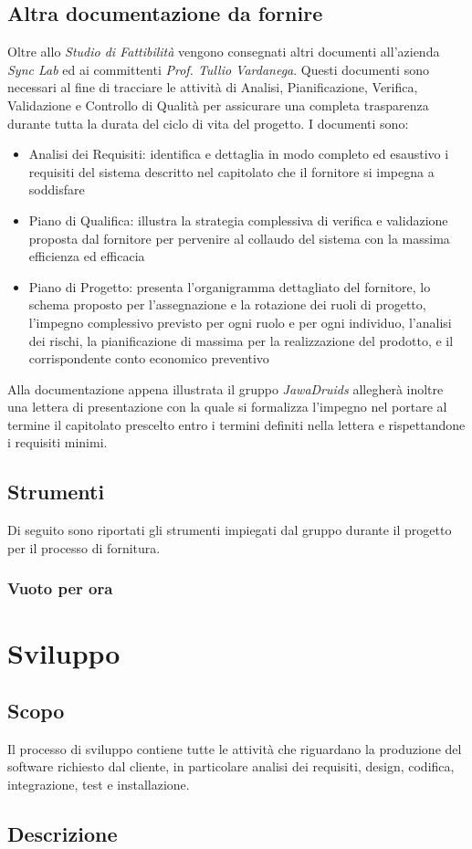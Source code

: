 \subsection{Altra documentazione da fornire}
Oltre allo \emph{Studio di Fattibilità} vengono consegnati altri documenti all'azienda \emph{Sync Lab} ed ai committenti \emph{Prof. Tullio Vardanega}. Questi documenti sono necessari al fine di tracciare le attività di Analisi, Pianificazione, Verifica, Validazione e Controllo di Qualità per assicurare una completa trasparenza durante tutta la durata del ciclo di vita del progetto.
I documenti sono:
\begin{itemize}
	\item Analisi dei Requisiti: identifica e dettaglia in modo completo ed esaustivo i requisiti del sistema descritto nel capitolato che il fornitore si impegna a soddisfare
	\item Piano di Qualifica: illustra la strategia complessiva di verifica e validazione proposta dal fornitore per pervenire al collaudo del sistema con la massima efficienza ed efficacia
	\item Piano di Progetto: presenta l'organigramma dettagliato del fornitore, lo schema proposto per l'assegnazione e la rotazione dei ruoli di progetto, l'impegno complessivo previsto per ogni ruolo e per ogni individuo, l'analisi dei rischi, la pianificazione di massima per la realizzazione del prodotto, e il corrispondente conto economico preventivo
\end{itemize} 
Alla documentazione appena illustrata il gruppo \emph{JawaDruids} allegherà inoltre una lettera di presentazione con la quale si formalizza l'impegno nel portare al termine il capitolato prescelto entro i termini definiti nella lettera e rispettandone i requisiti minimi.
\subsection{Strumenti}
Di seguito sono riportati gli strumenti impiegati dal gruppo durante il progetto per il processo di fornitura.
\subsubsection{Vuoto per ora}


\section{Sviluppo}
\subsection{Scopo}
Il processo di sviluppo contiene tutte le attività che riguardano la produzione del software richiesto dal cliente, in particolare analisi dei requisiti, design, codifica, integrazione, test e installazione.
\subsection{Descrizione}

